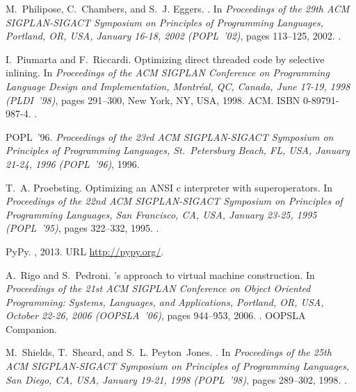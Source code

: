 \documentclass[preprint,10pt]{popl14conf}
\begin{document}
\begin{thebibliography}{46}
M.~Philipose, C.~Chambers, and S.~J. Eggers.
.
\newblock In \emph{Proceedings of the 29th {ACM SIGPLAN-SIGACT Symposium on
  Principles of Programming Languages}, Portland, OR, USA, January 16-18, 2002
  (POPL~'02)}, pages 113--125, 2002.
\newblock {}.

I.~Piumarta and F.~Riccardi.
\newblock Optimizing direct threaded code by selective inlining.
\newblock In \emph{Proceedings of the {ACM SIGPLAN Conference on Programming
  Language Design and Implementation}, Montr{\'e}al, QC, Canada, June 17-19,
  1998 (PLDI~'98)}, pages 291--300, New York, NY, USA, 1998. ACM.
\newblock ISBN 0-89791-987-4.
\newblock {}.

POPL~'96.
\newblock \emph{Proceedings of the 23rd {ACM SIGPLAN-SIGACT Symposium on
  Principles of Programming Languages}, St.~Petersburg Beach, FL, USA, January
  21-24, 1996 (POPL~'96)}, 1996.

T.~A. Proebsting.
\newblock Optimizing an {ANSI} c interpreter with superoperators.
\newblock In \emph{Proceedings of the 22nd {ACM SIGPLAN-SIGACT Symposium on
  Principles of Programming Languages}, San Francisco, CA, USA, January 23-25,
  1995 (POPL~'95)}, pages 322--332, 1995.
\newblock {}.

{PyPy}.
, 2013.
\newblock URL \url{http://pypy.org/}.

A.~Rigo and S.~Pedroni.
's approach to virtual machine construction.
\newblock In \emph{Proceedings of the 21st {ACM} {SIGPLAN} {C}onference on
  {O}bject {O}riented {P}rogramming: {S}ystems, {L}anguages, and
  {A}pplications, Portland, OR, USA, October 22-26, 2006 (OOPSLA~'06)}, pages
  944--953, 2006.
\newblock {}.
\newblock OOPSLA Companion.

M.~Shields, T.~Sheard, and S.~L. Peyton~Jones.
.
\newblock In \emph{Proceedings of the 25th {ACM SIGPLAN-SIGACT Symposium on
  Principles of Programming Languages}, San Diego, CA, USA, January 19-21, 1998
  (POPL~'98)}, pages 289--302, 1998.
\newblock {}.


\end{thebibliography}
\end{document}
